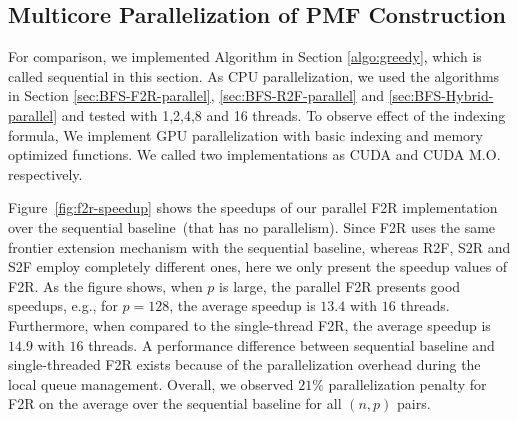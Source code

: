 \documentclass[12pt]{article}
\begin{document}
\subsection{Multicore Parallelization of PMF Construction}

For comparison, we implemented Algorithm in Section \ref{algo:greedy}, which is called sequential in this section. As CPU parallelization, we used the algorithms in Section \ref{sec:BFS-F2R-parallel}, \ref{sec:BFS-R2F-parallel} and \ref{sec:BFS-Hybrid-parallel} and tested with 1,2,4,8 and 16 threads. To observe effect of the indexing formula, We implement GPU parallelization with basic indexing and memory optimized functions. We called two implementations as CUDA and CUDA M.O. respectively.

Figure~\ref{fig:f2r-speedup} shows the speedups of our parallel F2R implementation over the sequential baseline~(that has no parallelism). Since F2R uses the same frontier extension mechanism with the sequential baseline, whereas R2F, S2R and S2F employ completely different ones, here we only present the speedup values of F2R. As the figure shows, when $p$ is large, the parallel F2R presents good speedups, e.g., for $p = 128$, the average speedup is $13.4$ with $16$ threads. Furthermore, when compared to the single-thread F2R, the average speedup is $14.9$ with $16$ threads. A performance difference between sequential baseline and single-threaded F2R exists because of the parallelization overhead during the local queue management. Overall, we observed $21\%$ parallelization penalty for F2R on the average over the sequential baseline for all $(n, p)$ pairs.
\end{document}
